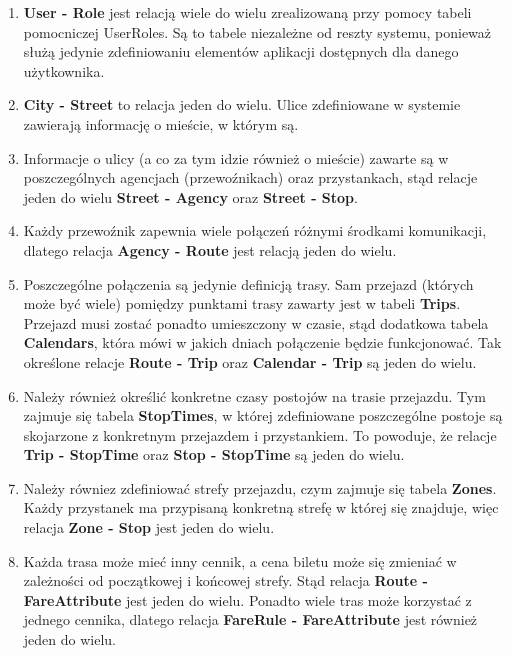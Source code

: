 \documentclass[10pt,a4paper]{article}
\begin{document}
\begin{enumerate}
	\item \textbf{User - Role} jest relacją wiele do wielu zrealizowaną przy pomocy tabeli pomocniczej UserRoles. Są to tabele niezależne od reszty systemu, ponieważ służą jedynie zdefiniowaniu elementów aplikacji dostępnych dla danego użytkownika.
	\item \textbf{City - Street} to relacja jeden do wielu. Ulice zdefiniowane w systemie zawierają informację o mieście, w którym są.
	\item Informacje o ulicy (a co za tym idzie również o mieście) zawarte są w poszczególnych agencjach (przewoźnikach) oraz przystankach, stąd relacje jeden do wielu \textbf{Street - Agency} oraz \textbf{Street - Stop}.
	\item Każdy przewoźnik zapewnia wiele połączeń różnymi środkami komunikacji, dlatego relacja \textbf{Agency - Route} jest relacją jeden do wielu.
	\item Poszczególne połączenia są jedynie definicją trasy. Sam przejazd (których może być wiele) pomiędzy punktami trasy zawarty jest w tabeli \textbf{Trips}. Przejazd musi zostać ponadto umieszczony w czasie, stąd dodatkowa tabela \textbf{Calendars}, która mówi w jakich dniach połączenie będzie funkcjonować. Tak określone relacje \textbf{Route - Trip} oraz \textbf{Calendar - Trip} są jeden do wielu.
	\item Należy również określić konkretne czasy postojów na trasie przejazdu. Tym zajmuje się tabela \textbf{StopTimes}, w której zdefiniowane poszczególne postoje są skojarzone z konkretnym przejazdem i przystankiem. To powoduje, że relacje \textbf{Trip - StopTime} oraz \textbf{Stop - StopTime} są jeden do wielu.
	\item Należy równiez zdefiniować strefy przejazdu, czym zajmuje się tabela \textbf{Zones}. Każdy przystanek ma przypisaną konkretną strefę w której się znajduje, więc relacja \textbf{Zone - Stop} jest jeden do wielu.
	\item Każda trasa może mieć inny cennik, a cena biletu może się zmieniać w zależności od początkowej i końcowej strefy. Stąd relacja \textbf{Route - FareAttribute} jest jeden do wielu. Ponadto wiele tras może korzystać z jednego cennika, dlatego relacja \textbf{FareRule - FareAttribute} jest również jeden do wielu.
\end{enumerate}
\end{document}
